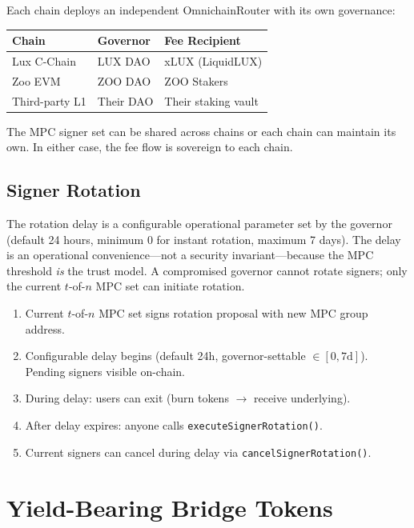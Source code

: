 \documentclass[11pt]{article}
\begin{document}
Each chain deploys an independent OmnichainRouter with its own governance:

\begin{center}
\small
\begin{tabular}{lll}
\toprule
\textbf{Chain} & \textbf{Governor} & \textbf{Fee Recipient} \\
\midrule
Lux C-Chain & LUX DAO & xLUX (LiquidLUX) \\
Zoo EVM & ZOO DAO & ZOO Stakers \\
Third-party L1 & Their DAO & Their staking vault \\
\bottomrule
\end{tabular}
\end{center}

The MPC signer set can be shared across chains or each chain can maintain its own. In either case, the fee flow is sovereign to each chain.

\subsection{Signer Rotation}

The rotation delay is a configurable operational parameter set by the governor (default 24 hours, minimum 0 for instant rotation, maximum 7 days). The delay is an operational convenience---not a security invariant---because the MPC threshold \emph{is} the trust model. A compromised governor cannot rotate signers; only the current $t$-of-$n$ MPC set can initiate rotation.

\begin{enumerate}[nosep]
  \item Current $t$-of-$n$ MPC set signs rotation proposal with new MPC group address.
  \item Configurable delay begins (default 24h, governor-settable $\in [0, 7\text{d}]$). Pending signers visible on-chain.
  \item During delay: users can exit (burn tokens $\to$ receive underlying).
  \item After delay expires: anyone calls \texttt{executeSignerRotation()}.
  \item Current signers can cancel during delay via \texttt{cancelSignerRotation()}.
\end{enumerate}

\section{Yield-Bearing Bridge Tokens}
\label{sec:yield}
\end{document}
